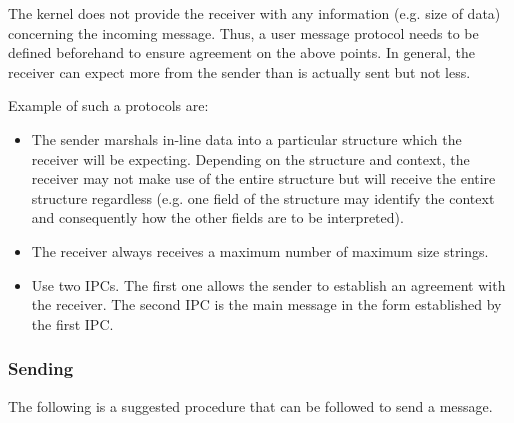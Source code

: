 The kernel does not provide the receiver with any information (e.g.
size of data) concerning the incoming message. Thus, a user message
protocol needs to be defined beforehand to ensure agreement on the
above points. In general, the receiver can expect more from the sender
than is actually sent but not less.

Example of such a protocols are:

\begin{itemize}

\item The sender marshals in-line data into a particular structure
  which the receiver will be expecting. Depending on the structure and
  context, the receiver may not make use of the entire structure but
  will receive the entire structure regardless (e.g. one field of the
  structure may identify the context and consequently how the other
  fields are to be interpreted).

\item The receiver always receives a maximum number of maximum size
  strings.

\item Use two IPCs. The first one allows the sender to establish an
  agreement with the receiver. The second IPC is the main message in
  the form established by the first IPC.

\end{itemize} 


\subsubsection{Sending}



The following is a suggested procedure that can be followed to send a message.

